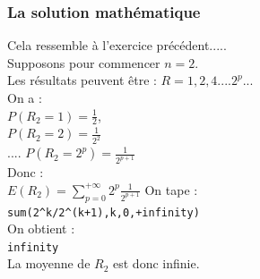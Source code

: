 \documentclass[a4paper,11pt]{book}
\begin{document}
\subsubsection{La solution math\'ematique}
Cela ressemble \`a l'exercice pr\'ec\'edent.....\\
Supposons pour commencer $n=2$.\\
Les r\'esultats peuvent \^etre : $R=1,2,4....2^p...$\\
On a :\\
$\displaystyle P(R_2=1)=\frac{1}{2}$,\\
$\displaystyle P(R_2=2)=\frac{1}{2^2}$\\
....
$\displaystyle P(R_2=2^p)=\frac{1}{2^{p+1}}$\\
Donc :\\
$\displaystyle E(R_2)=\sum_{p=0}^{+\infty} 2^p\frac{1}{2^{p+1}}$
On tape :\\
{\tt sum(2\verb|^|k/2\verb|^|(k+1),k,0,+infinity)}\\
On obtient :\\
{\tt infinity}\\
La moyenne de $R_2$ est donc infinie.\\
\end{document}
